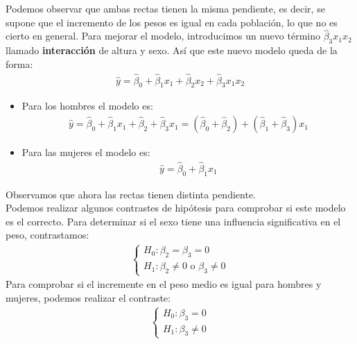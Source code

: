 \begin{ejemplo}
\noindent Podemos observar que ambas rectas tienen la misma pendiente, es decir, se supone que el incremento de los pesos es igual en cada población, lo que no es cierto en general.  Para mejorar el modelo, introducimos un nuevo término $\widehat{\beta}_3x_1x_2$ llamado \textbf{interacción} de altura y sexo. Así que este nuevo modelo queda de la forma:
\begin{align*}
    \widehat{y} = \widehat{\beta}_0 + \widehat{\beta}_1x_1 + \widehat{\beta}_2x_2 + \widehat{\beta}_3x_1x_2
\end{align*}
\begin{itemize}
    \item Para los hombres el modelo es:
            \begin{align*}
                \widehat{y} = \widehat{\beta}_0 + \widehat{\beta}_1x_1 + \widehat{\beta}_2 + \widehat{\beta}_3x_1 = (\widehat{\beta}_0 + \widehat{\beta}_2) + (\widehat{\beta}_1 + \widehat{\beta}_3)x_1
            \end{align*}
    \item Para las mujeres el modelo es:
        \begin{align*}
            \widehat{y} = \widehat{\beta}_0 + \widehat{\beta}_1x_1
        \end{align*}
\end{itemize}
Observamos que ahora las rectas tienen distinta pendiente. 
\\
\newline
Podemos realizar algunos contrastes de hipótesis para comprobar si este modelo es el correcto. Para determinar si el sexo tiene una influencia significativa en el peso, contrastamos:
\begin{align*}
    \begin{cases}
        H_0: \beta_2 = \beta_3 = 0 \\
        H_1: \beta_2 \neq 0 \text{ o } \beta_3 \neq 0
    \end{cases}
\end{align*}
Para comprobar si el incremente en el peso medio es igual para hombres y mujeres, podemos realizar el contraste:
\begin{align*}
    \begin{cases}
        H_0: \beta_3 = 0 \\
        H_1: \beta_3 \neq 0
    \end{cases}
\end{align*}    
\end{ejemplo}

